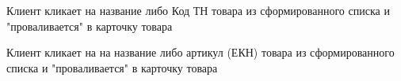 {


\begin{wiki}
Клиент кликает на название либо Код ТН товара из сформированного списка и "проваливается" в карточку товара
\end{wiki}


\begin{itogo}
Клиент кликает на на название либо артикул (ЕКН) товара из сформированного списка и "проваливается" в карточку товара
\end{itogo}





}


